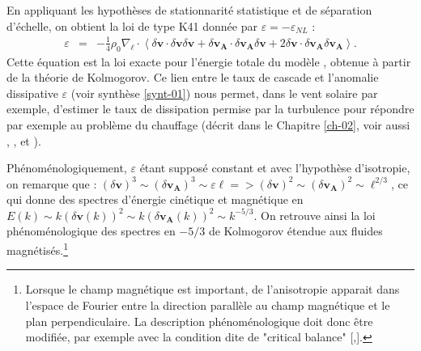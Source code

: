 En appliquant les hypothèses de stationnarité statistique et de séparation d'échelle, on obtient la loi de type K41 donnée par $\varepsilon = - \varepsilon_{NL}$ : 
\begin{eqnarray}
\label{eq:turb_inc_ELK}     \varepsilon &=& - \frac{1}{4} \rho_0 \nabla_{\boldsymbol{\ell}} \cdot \left< \delta \boldsymbol{v} \cdot \delta \boldsymbol{v} \delta \boldsymbol{v} + \delta \boldsymbol{v_A} \cdot \delta \boldsymbol{v_A} \delta \boldsymbol{v} + 2 \delta \boldsymbol{v} \cdot \delta \boldsymbol{v_A} \delta \boldsymbol{v_A}\right> .
\end{eqnarray}
Cette équation est la loi exacte  pour l'énergie totale du modèle , obtenue à partir de la théorie de Kolmogorov. Ce lien entre le taux de cascade et l'anomalie dissipative $\varepsilon$ (voir synthèse \ref{synt-01}) nous permet, dans le vent solaire par exemple, d'estimer le taux de dissipation permise par la turbulence pour répondre par exemple au problème du chauffage (décrit dans le Chapitre \ref{ch-02}, voir aussi \cite{macbride_turbulence_2005}, \cite{sorriso-valvo_observation_2007}, \cite{stawarz_turbulent_2009} et \cite{osman_proton_2013}). 

Phénoménologiquement, $\varepsilon$ étant supposé constant et avec l'hypothèse d'isotropie, on remarque que : $(\delta \boldsymbol{v})^3 \sim (\delta \boldsymbol{v_A})^3 \sim \varepsilon \ell => (\delta \boldsymbol{v})^2 \sim (\delta \boldsymbol{v_A})^2 \sim \ell^{2/3}$, ce qui donne des spectres  d'énergie cinétique et magnétique en $E(k) \sim k(\delta \boldsymbol{v}(k))^2  \sim k(\delta \boldsymbol{v_A}(k))^2  \sim k^{-5/3}$. On retrouve ainsi la loi phénoménologique des spectres en $-5/3$ de Kolmogorov étendue aux fluides magnétisés.\footnote{Lorsque le champ magnétique est important, de l'anisotropie apparait dans l'espace de Fourier entre la direction parallèle au champ magnétique et le plan perpendiculaire. La description phénoménologique doit donc être modifiée, par exemple avec la condition dite de "critical balance" [\cite{goldreich_toward_1995},\cite{horbury_anisotropic_2008}].}

